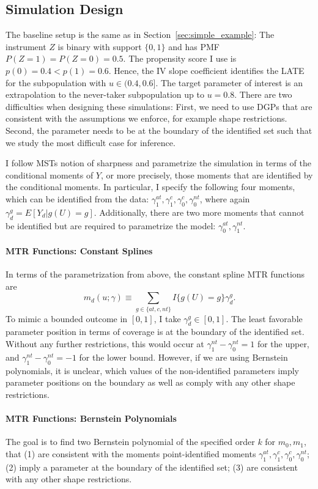 \documentclass[12pt,a4paper,english]{article} %
\numberwithin{equation}{section}
\theoremstyle{definition}
\theoremstyle{remark}
\theoremstyle{plain}
\begin{document}
\subsection{Simulation Design}
The baseline setup is the same as in Section~\ref{sec:simple_example}:
The instrument $Z$ is binary with support $\{0,1\}$ and has PMF $P(Z=1) = P(Z=0) = 0.5$.
The propensity score I use is $p(0) = 0.4 < p(1) = 0.6$.
Hence, the IV slope coefficient identifies the LATE for the subpopulation with $u\in(0.4, 0.6]$.
The target parameter of interest is an extrapolation to the never-taker subpopulation up to $u=0.8$.
There are two difficulties when designing these simulations: First, we need to use DGPs that are consistent with the assumptions we enforce, for example shape restrictions.
Second, the parameter needs to be at the boundary of the identified set such that we study the most difficult case for inference.

I follow MSTs notion of sharpness and parametrize the simulation in terms of the conditional moments of $Y$, or more precisely, those moments that are identified by the conditional moments.
In particular, I specify the following four moments, which can be identified from the data: $\gamma_1^{at}, \gamma_1^{c}, \gamma_0^{c}, \gamma_0^{nt}$, where again $\gamma_d^g = E[Y_d|g(U)=g]$.
Additionally, there are two more moments that cannot be identified but are required to parametrize the model: $\gamma_0^{at}, \gamma_1^{nt}$.


\paragraph{MTR Functions: Constant Splines}
In terms of the parametrization from above, the constant spline MTR functions are
\begin{equation*}
  m_d(u; \gamma) \equiv \sum_{g\in\{at, c, nt\}} I\{g(U) = g\} \gamma_{d}^g.
\end{equation*}
To mimic a bounded outcome in $[0,1]$, I take $\gamma_d^g\in[0,1]$.
The least favorable parameter position in terms of coverage is at the boundary of the identified set.
Without any further restrictions, this would occur at $\gamma_1^{nt} - \gamma_0^{nt} = 1$ for the upper, and $\gamma_1^{nt} - \gamma_0^{nt} = -1$ for the lower bound.
However, if we are using Bernstein polynomials, it is unclear, which values of the non-identified parameters imply parameter positions on the boundary as well as comply with any other shape restrictions.

\paragraph{MTR Functions: Bernstein Polynomials}
The goal is to find two Bernstein polynomial of the specified order $k$ for $m_0, m_1$, that
(1) are consistent with the moments point-identified moments $\gamma_1^{at}, \gamma_1^c, \gamma_0^c, \gamma_0^{nt}$;
(2) imply a parameter at the boundary of the identified set;
(3) are consistent with any other shape restrictions.
\end{document}
